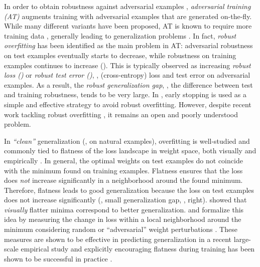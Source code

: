 In order to obtain robustness against adversarial examples \cite{SzegedyICLR2014}, \emph{adversarial training (AT)} \cite{MadryICLR2018} augments training with adversarial examples that are generated on-the-fly. While many different variants have been proposed, AT is known to require more training data \cite{KhouryARXIV2018,SchmidtNIPS2018}, generally leading to generalization problems \cite{FarniaICLR2019}. In fact, \emph{robust overfitting} \cite{RiceICML2020} has been identified as the main problem in AT:  adversarial robustness on test examples eventually starts to decrease, while robustness on training examples continues to increase (\cf {}). This is typically observed as increasing \emph{robust loss (\RCE)} or \emph{robust test error (\RTE)}, \ie, (cross-entropy) loss and test error on adversarial examples. As a result, the \emph{robust generalization gap}, \ie, the difference between test and training robustness, tends to be very large. In \cite{RiceICML2020}, early stopping is used as a simple and effective strategy to avoid robust overfitting. However, despite recent work tackling robust overfitting \cite{SinglaARXIV2021,WuNIPS2020,HwangARXIV2020}, it remains an open and poorly understood problem.

In \emph{``clean''} generalization (\ie, on natural examples), overfitting is well-studied and commonly tied to flatness of the loss landscape in weight space, both visually \cite{LiNIPS2018} and empirically \cite{NeyshaburNIPS2017,KeskarICLR2017,JiangICLR2020}.
In general, the optimal weights on test examples do not coincide with the minimum found on training examples. Flatness ensures that the loss does \emph{not} increase significantly in a neighborhood around the found minimum. Therefore, flatness leads to good generalization because the loss on test examples does not increase significantly (\ie, small generalization gap, \cf {}, right).
\cite{LiNIPS2018} showed that \emph{visually} flatter minima correspond to better generalization. \cite{NeyshaburNIPS2017} and \cite{KeskarICLR2017} formalize this idea by measuring the change in loss within a local neighborhood around the minimum considering random \cite{NeyshaburNIPS2017} or ``adversarial'' weight perturbations \cite{KeskarICLR2017}.
These measures are shown to be effective in predicting generalization in a recent large-scale empirical study \cite{JiangICLR2020} and explicitly encouraging flatness during training has been shown to be successful in practice \cite{ZhengARXIV2020c,CicekICCVWOR2019,TinICLR2020,ChaudhariICLR2017,IzmailovUAI2018}.


